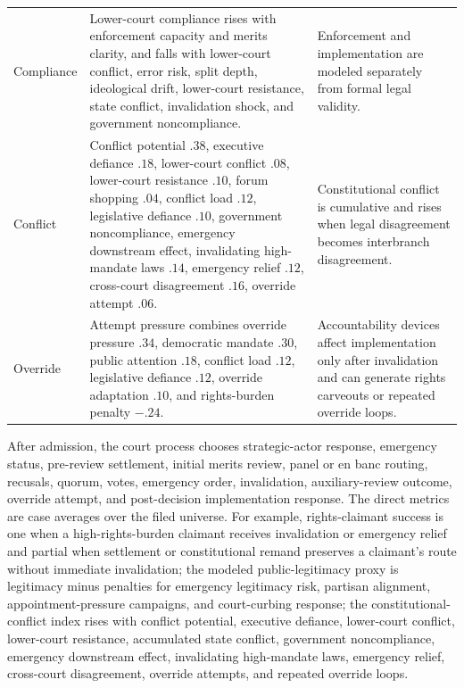 \documentclass[
    journal=jlc,
    manuscript=research-article,
    year=2026,
  ]{cup-journal}
\begin{document}
\begin{table}[p]
\begin{tabular}{>{\raggedright\arraybackslash}p{1.05in}>{\raggedright\arraybackslash}p{2.05in}>{\raggedright\arraybackslash}p{1.75in}}
Compliance & Lower-court compliance rises with enforcement capacity and merits clarity, and falls with lower-court conflict, error risk, split depth, ideological drift, lower-court resistance, state conflict, invalidation shock, and government noncompliance. & Enforcement and implementation are modeled separately from formal legal validity. \\
Conflict & Conflict potential $.38$, executive defiance $.18$, lower-court conflict $.08$, lower-court resistance $.10$, forum shopping $.04$, conflict load $.12$, legislative defiance $.10$, government noncompliance, emergency downstream effect, invalidating high-mandate laws $.14$, emergency relief $.12$, cross-court disagreement $.16$, override attempt $.06$. & Constitutional conflict is cumulative and rises when legal disagreement becomes interbranch disagreement. \\
Override & Attempt pressure combines override pressure $.34$, democratic mandate $.30$, public attention $.18$, conflict load $.12$, legislative defiance $.12$, override adaptation $.10$, and rights-burden penalty $-.24$. & Accountability devices affect implementation only after invalidation and can generate rights carveouts or repeated override loops. \\
\bottomrule
\end{tabular}
\end{table}

After admission, the court process chooses strategic-actor response, emergency status, pre-review settlement, initial merits review, panel or en banc routing, recusals, quorum, votes, emergency order, invalidation, auxiliary-review outcome, override attempt, and post-decision implementation response. The direct metrics are case averages over the filed universe. For example, rights-claimant success is one when a high-rights-burden claimant receives invalidation or emergency relief and partial when settlement or constitutional remand preserves a claimant's route without immediate invalidation; the modeled public-legitimacy proxy is legitimacy minus penalties for emergency legitimacy risk, partisan alignment, appointment-pressure campaigns, and court-curbing response; the constitutional-conflict index rises with conflict potential, executive defiance, lower-court conflict, lower-court resistance, accumulated state conflict, government noncompliance, emergency downstream effect, invalidating high-mandate laws, emergency relief, cross-court disagreement, override attempts, and repeated override loops.
\end{document}
